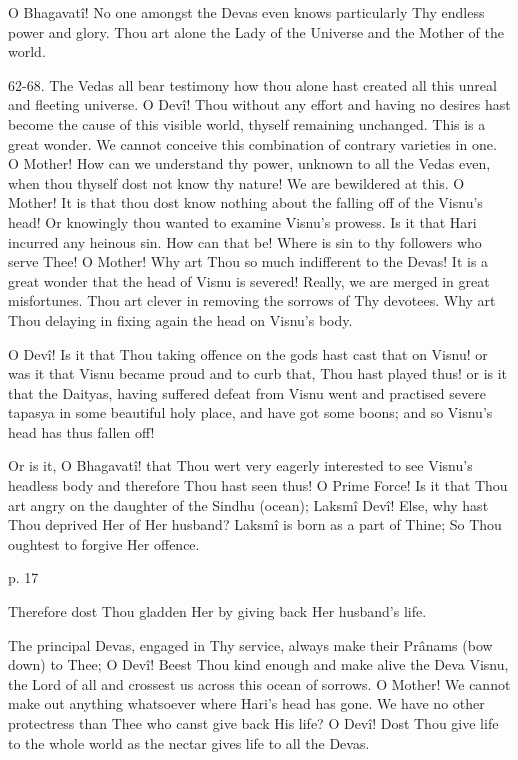  

O Bhagavatî! No one amongst the Devas even knows particularly Thy endless power and glory. Thou art alone the Lady of the Universe and the Mother of the world.

 

62-68. The Vedas all bear testimony how thou alone hast created all this unreal and fleeting universe. O Devî! Thou without any effort and having no desires hast become the cause of this visible world, thyself remaining unchanged. This is a great wonder. We cannot conceive this combination of contrary varieties in one. O Mother! How can we understand thy power, unknown to all the Vedas even, when thou thyself dost not know thy nature! We are bewildered at this. O Mother! It is that thou dost know nothing about the falling off of the Visnu's head! Or knowingly thou wanted to examine Visnu's prowess. Is it that Hari incurred any heinous sin. How can that be! Where is sin to thy followers who serve Thee! O Mother! Why art Thou so much indifferent to the Devas! It is a great wonder that the head of Visnu is severed! Really, we are merged in great misfortunes. Thou art clever in removing the sorrows of Thy devotees. Why art Thou delaying in fixing again the head on Visnu's body.

 

O Devî! Is it that Thou taking offence on the gods hast cast that on Visnu! or was it that Visnu became proud and to curb that, Thou hast played thus! or is it that the Daityas, having suffered defeat from Visnu went and practised severe tapasya in some beautiful holy place, and have got some boons; and so Visnu's head has thus fallen off!

 

Or is it, O Bhagavatî! that Thou wert very eagerly interested to see Visnu's headless body and therefore Thou hast seen thus! O Prime Force! Is it that Thou art angry on the daughter of the Sindhu (ocean); Laksmî Devî! Else, why hast Thou deprived Her of Her husband? Laksmî is born as a part of Thine; So Thou oughtest to forgive Her offence.

 

p. 17

 

Therefore dost Thou gladden Her by giving back Her husband's life.

 

The principal Devas, engaged in Thy service, always make their Prânams (bow down) to Thee; O Devî! Beest Thou kind enough and make alive the Deva Visnu, the Lord of all and crossest us across this ocean of sorrows. O Mother! We cannot make out anything whatsoever where Hari's head has gone. We have no other protectress than Thee who canst give back His life? O Devî! Dost Thou give life to the whole world as the nectar gives life to all the Devas.

